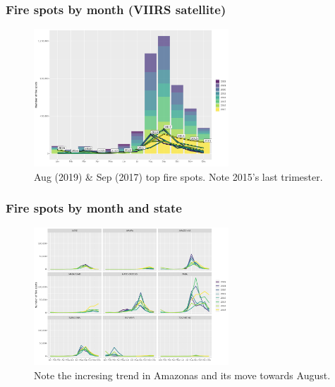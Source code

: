 \documentclass[aspectratio=169]{beamer}
\begin{document}
\begin{frame}
  \frametitle{Fire spots by month (VIIRS satellite)}
    \begin{figure}[h] 
        \includegraphics[width=0.65\textwidth] 
        {./figures/plot_fire_spots_by_month.png} 
        \caption{Aug (2019) \& Sep (2017) top fire spots. 
        Note 2015's last trimester.}
    \end{figure}
\end{frame}

\begin{frame}
    \frametitle{Fire spots by month and state}
    \begin{figure}[h]
        \includegraphics[width=0.65\textwidth]
        {./figures/plot_fire_spots_by_month_state.png}
        \caption{Note the incresing trend in Amazonas and its move towards
        August.}
    \end{figure}
\end{frame}

\end{document}
